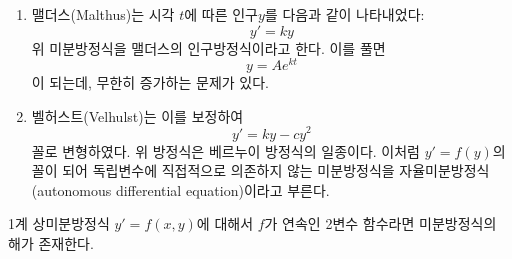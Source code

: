 \documentclass[../engineering_mathematics_lecture_note.tex]{subfiles}
\begin{document}
\begin{example}
    \leavevmode
    \begin{enumerate}
        \item 맬더스(Malthus)는 시각 $t$에 따른 인구$y$를 다음과 같이 나타내었다:
            \begin{equation*}
                y' = ky
            \end{equation*}
            위 미분방정식을 맬더스의 인구방정식이라고 한다.
            이를 풀면
            \begin{equation*}
                y = A e^{kt}
            \end{equation*}
            이 되는데, 무한히 증가하는 문제가 있다.
        \item 벨허스트(Velhulst)는 이를 보정하여
            \begin{equation*}
                y' = ky - cy^2
            \end{equation*}
            꼴로 변형하였다.
            위 방정식은 베르누이 방정식의 일종이다.
            이처럼 $y' = f(y)$의 꼴이 되어 독립변수에 직접적으로 의존하지 않는 미분방정식을 자율미분방정식(autonomous differential equation)이라고 부른다.
    \end{enumerate}
\end{example}

\begin{theorem}
    1계 상미분방정식 $y' = f(x, y)$에 대해서 $f$가 연속인 2변수 함수라면 미분방정식의 해가 존재한다.
\end{theorem}
\end{document}
